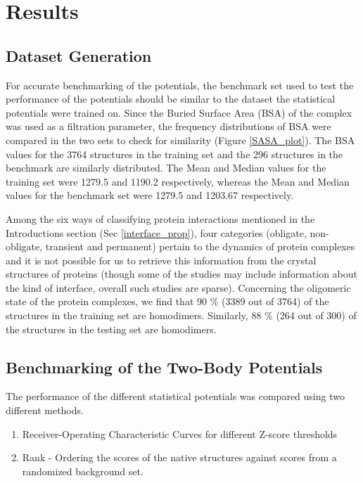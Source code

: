 \chapter{Results}
\label{results}

\pagestyle{fancy}


\fancyhf{}
\fancyfoot[RO, LE]{\thepage}

\section{Dataset Generation}
For accurate benchmarking of the potentials, the benchmark set used to test the performance of the potentials should be similar to the dataset the statistical potentials were trained on. Since the Buried Surface Area (BSA) of the complex was used as a filtration parameter, the frequency distributions of BSA were compared in the two sets to check for similarity (Figure \ref{SASA_plot}). The BSA values for the 3764 structures in the training set and the 296 structures in the benchmark are similarly distributed. The Mean and Median values for the training set were 1279.5 and 1190.2 respectively, whereas the Mean and Median values for the benchmark set were 1279.5 and 1203.67 respectively.

\par
Among the six ways of classifying protein interactions mentioned in the Introductions section (Sec \ref{interface_prop}), four categories (obligate, non-obligate, transient and permanent) pertain to the dynamics of protein complexes and it is not possible for us to retrieve this information from the crystal structures of proteins (though some of the studies may include information about the kind of interface, overall such studies are sparse). Concerning the oligomeric state of the protein complexes, we find that 90 \% (3389 out of 3764) of the structures in the training set are homodimers. Similarly, 88 \% (264 out of 300) of the structures in the testing set are homodimers.

\section{Benchmarking of the Two-Body Potentials}
The performance of the different statistical potentials was compared using two different methods.
\begin{enumerate}
\item Receiver-Operating Characteristic Curves for different Z-score thresholds
\item Rank - Ordering the scores of the native structures against scores from a randomized background set.
\end{enumerate} 

